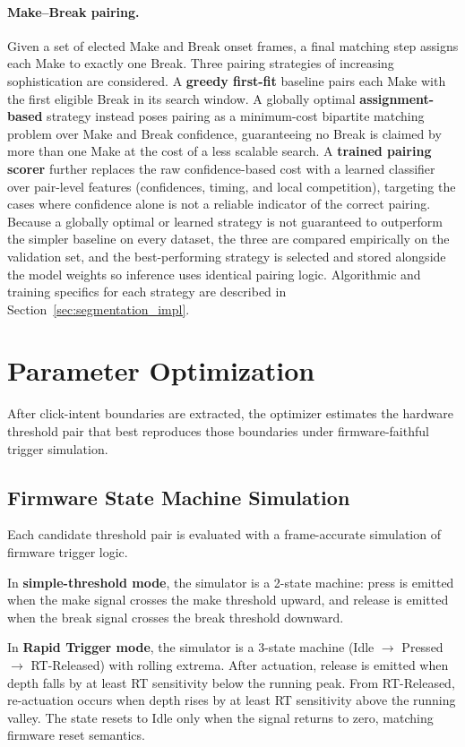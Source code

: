 \paragraph{Make--Break pairing.}
Given a set of elected Make and Break onset frames, a final matching step assigns each Make to exactly one Break. Three pairing strategies of increasing sophistication are considered. A \textbf{greedy first-fit} baseline pairs each Make with the first eligible Break in its search window. A globally optimal \textbf{assignment-based} strategy instead poses pairing as a minimum-cost bipartite matching problem over Make and Break confidence, guaranteeing no Break is claimed by more than one Make at the cost of a less scalable search. A \textbf{trained pairing scorer} further replaces the raw confidence-based cost with a learned classifier over pair-level features (confidences, timing, and local competition), targeting the cases where confidence alone is not a reliable indicator of the correct pairing. Because a globally optimal or learned strategy is not guaranteed to outperform the simpler baseline on every dataset, the three are compared empirically on the validation set, and the best-performing strategy is selected and stored alongside the model weights so inference uses identical pairing logic. Algorithmic and training specifics for each strategy are described in Section~\ref{sec:segmentation_impl}.

\section{Parameter Optimization}
\label{sec:optimizer}

After click-intent boundaries are extracted, the optimizer estimates the hardware threshold pair that best reproduces those boundaries under firmware-faithful trigger simulation.

\subsection{Firmware State Machine Simulation}
Each candidate threshold pair is evaluated with a frame-accurate simulation of firmware trigger logic.

In \textbf{simple-threshold mode}, the simulator is a 2-state machine: press is emitted when the make signal crosses the make threshold upward, and release is emitted when the break signal crosses the break threshold downward.

In \textbf{Rapid Trigger mode}, the simulator is a 3-state machine (Idle $\to$ Pressed $\to$ RT-Released) with rolling extrema. After actuation, release is emitted when depth falls by at least RT sensitivity below the running peak. From RT-Released, re-actuation occurs when depth rises by at least RT sensitivity above the running valley. The state resets to Idle only when the signal returns to zero, matching firmware reset semantics.

